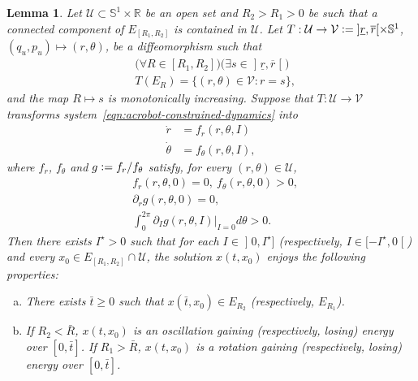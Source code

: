 \documentclass[journal,twoside,web, twocolumn]{ieeecolor}
\newtheorem{lemma}{Lemma} %
\renewcommand*{\Re}{\mathbb{R}}
\newcommand*{\Sone}{\mathbb{S}^1}
\newcommand*{\cU}{\mathcal{U}}
\newcommand*{\cV}{\mathcal{V}}
\newcommand*{\eqdef}{\vcentcolon=}
\begin{document}
\begin{lemma}\label{lem:gain_lose}Let $\cU \subset \Sone \times \Re$ be an open set and $R_2 > R_1 >0$ be such that a connected component of $E_{[R_1,R_2]}$ is contained in $\cU$. Let $T : \cU \to \cV \eqdef \mathopen]\underline{r},\overline{r}[ \times \Sone$, $(q_u,p_u) \mapsto (r,\theta)$, be a diffeomorphism such that 
\begin{equation}\label{eq:T_property}
\begin{aligned}
&\big(\forall R \in [R_1,R_2]\big) \big(\exists s \in \mathopen]\underline{r},\overline{r}\mathclose[\big) \\
& T(E_R) = \{(r,\theta) \in \cV: r = s \},
\end{aligned}
\end{equation}
and the map $R \mapsto s$ is monotonically increasing.
Suppose that $T: \cU \to \cV$ transforms system~\eqref{eqn:acrobot-constrained-dynamics} into
\begin{equation}
\label{eq:r_theta_system}
\begin{aligned}
\dot r &= f_r(r,\theta,I) \\
\dot \theta &= f_\theta(r,\theta,I),
\end{aligned}
\end{equation}
where $f_r$, $f_\theta$ and $g \eqdef f_r / f_\theta$ satisfy, for every $(r,\theta) \in \cU$,
\begin{subequations}\label{eq:lemma_assumptions}
\begin{align}
& f_r(r,\theta,0) = 0, \ f_\theta(r,\theta,0) >0, \label{eq:lemma_assumptions:1}\\
& \partial_r g(r,\theta,0) =0, \label{eq:lemma:assumptions:2}\\
& \int_0^{2\pi} \partial_I g(r,\theta,I)\big|_{I=0} d \theta >0. \label{eq:lemma:assumptions:3} 
\end{align}
\end{subequations}
Then there exists $I^\star>0$ such that for each $I \in \mathopen]0,I^\star]$ (respectively, $I \in [-I^\star,0\mathclose[$) and every $x_0 \in E_{[R_1,R_2]} \cap \cU$, the solution $x(t,x_0)$ enjoys the following properties:

\begin{enumerate}[(a)]
\item There exists $\bar t \geq 0$ such that $x(\bar t,x_0) \in E_{R_2}$ (respectively, $E_{R_1}$).

\item If $R_2 < \bar R$, $x(t,x_0)$ is an oscillation gaining (respectively, losing) energy over $[0,\bar t]$. If $R_1 > \bar R$, $x(t,x_0)$ is a rotation gaining (respectively, losing) energy over $[0,\bar t]$.
\end{enumerate}
\end{lemma}
\end{document}
